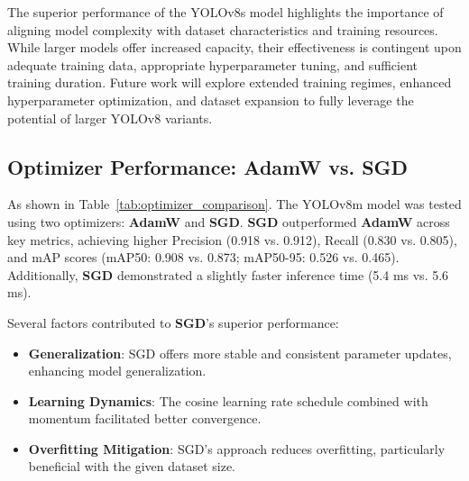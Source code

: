 \documentclass[conference]{IEEEtran}
\begin{document}
The superior performance of the YOLOv8s model highlights the importance of aligning model complexity with dataset characteristics and training resources. While larger models offer increased capacity, their effectiveness is contingent upon adequate training data, appropriate hyperparameter tuning, and sufficient training duration. Future work will explore extended training regimes, enhanced hyperparameter optimization, and dataset expansion to fully leverage the potential of larger YOLOv8 variants.


\begin{table}[htbp]
    \centering
    \caption{Comparison of Optimizers for YOLOv8m Model in COTS Detection}
    \label{tab:optimizer_comparison}
\end{table}

\subsection{Optimizer Performance: AdamW vs. SGD}

As shown in Table~\ref{tab:optimizer_comparison}. The YOLOv8m model was tested using two optimizers: \textbf{AdamW} and \textbf{SGD}. \textbf{SGD} outperformed \textbf{AdamW} across key metrics, achieving higher Precision (0.918 vs. 0.912), Recall (0.830 vs. 0.805), and mAP scores (mAP50: 0.908 vs. 0.873; mAP50-95: 0.526 vs. 0.465). Additionally, \textbf{SGD} demonstrated a slightly faster inference time (5.4 ms vs. 5.6 ms).

Several factors contributed to \textbf{SGD}'s superior performance:
\begin{itemize}
    \item \textbf{Generalization}: SGD offers more stable and consistent parameter updates, enhancing model generalization.
    \item \textbf{Learning Dynamics}: The cosine learning rate schedule combined with momentum facilitated better convergence.
    \item \textbf{Overfitting Mitigation}: SGD's approach reduces overfitting, particularly beneficial with the given dataset size.
\end{itemize}
\end{document}
